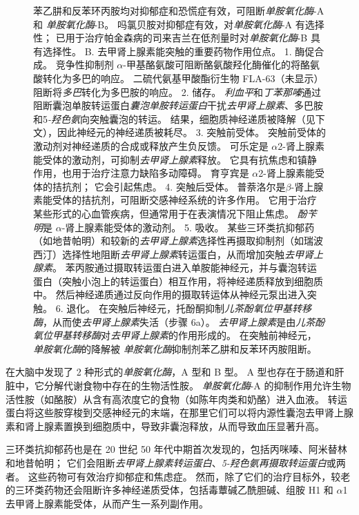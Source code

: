 \begin{figure}[htbp]
{	苯乙肼和反苯环丙胺均对抑郁症和恐慌症有效，可阻断\textit{单胺氧化酶}-A 和 \textit{单胺氧化酶}-B。
	吗氯贝胺对抑郁症有效，对\textit{单胺氧化酶}-A 有选择性；
	已用于治疗帕金森病的司来吉兰在低剂量时对\textit{单胺氧化酶}-B 具有选择性。 
	B. 去甲肾上腺素能突触的重要药物作用位点。 
	1. 酶促合成。
	竞争性抑制剂 $\alpha$-甲基酪氨酸可阻断酪氨酸羟化酶催化的将酪氨酸转化为多巴的响应。
	二硫代氨基甲酸酯衍生物 FLA-63（未显示）阻断将\textit{多巴}转化为多巴胺的响应。
	2. 储存。
	\textit{利血平}和\textit{丁苯那嗪}通过阻断囊泡单胺转运蛋白\textit{囊泡单胺转运蛋白}干扰\textit{去甲肾上腺素}、多巴胺和5\textit{-羟色氨}向突触囊泡的转运。
	结果，细胞质神经递质被降解（见下文），因此神经元的神经递质被耗尽。
	3. 突触前受体。
	突触前受体的激动剂对神经递质的合成或释放产生负反馈。
	可乐定是 $\alpha$2-肾上腺素能受体的激动剂，可抑制\textit{去甲肾上腺素}释放。
	它具有抗焦虑和镇静作用，也用于治疗注意力缺陷多动障碍。
	育亨宾是 $\alpha$2-肾上腺素能受体的拮抗剂； 它会引起焦虑。
	4. 突触后受体。
	普萘洛尔是$\beta$-肾上腺素能受体的拮抗剂，可阻断交感神经系统的许多作用。
	它用于治疗某些形式的心血管疾病，但通常用于在表演情况下阻止焦虑。
	\textit{酚苄明}是 $\alpha$-肾上腺素能受体的激动剂。
	5. 吸收。
	某些三环类抗抑郁药（如地昔帕明）和较新的\textit{去甲肾上腺素}选择性再摄取抑制剂（如瑞波西汀）选择性地阻断\textit{去甲肾上腺素}转运蛋白，从而增加突触\textit{去甲肾上腺素}。
	苯丙胺通过摄取转运蛋白进入单胺能神经元，并与囊泡转运蛋白（突触小泡上的转运蛋白）相互作用，将神经递质释放到细胞质中。
	然后神经递质通过反向作用的摄取转运体从神经元泵出进入突触。
	6. 退化。
	在突触后神经元，托酚酮抑制\textit{儿茶酚氧位甲基转移酶}，从而使\textit{去甲肾上腺素}失活（步骤 6a）。
	\textit{去甲肾上腺素}是由\textit{儿茶酚氧位甲基转移酶}对\textit{去甲肾上腺素}的作用形成的。
	在突触前神经元，\textit{单胺氧化酶}的降解被 \textit{单胺氧化酶}抑制剂苯乙肼和反苯环丙胺阻断。}
\end{figure}


在大脑中发现了 2 种形式的\textit{单胺氧化酶}，A 型和 B 型。
A 型也存在于肠道和肝脏中，它分解代谢食物中存在的生物活性胺。
\textit{单胺氧化酶}-A 的抑制作用允许生物活性胺（如酪胺）从含有高浓度它的食物（如陈年肉类和奶酪）进入血液。
转运蛋白将这些胺穿梭到交感神经元的末端，在那里它们可以将内源性囊泡去甲肾上腺素和肾上腺素置换到细胞质中，导致非囊泡释放，从而导致血压显著升高。


三环类抗抑郁药也是在 20 世纪 50 年代中期首次发现的，包括丙咪嗪、阿米替林和地昔帕明；
它们会阻断\textit{去甲肾上腺素转运蛋白}、\textit{5-羟色氨再摄取转运蛋白}或两者。
这些药物可有效治疗抑郁症和焦虑症。
然而，除了它们的治疗目标外，较老的三环类药物还会阻断许多神经递质受体，包括毒蕈碱乙酰胆碱、组胺 H1 和 $\alpha$1 去甲肾上腺素能受体，从而产生一系列副作用。


